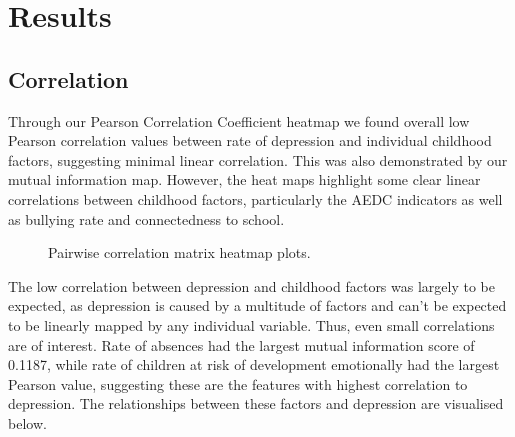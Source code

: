 \documentclass[a4, 11pt]{article}
\begin{document}
\newpage
\section{Results}
\subsection{Correlation}
Through our Pearson Correlation Coefficient heatmap we found overall low Pearson correlation values between rate of depression and individual childhood factors, suggesting minimal linear correlation. This was also demonstrated by our mutual information map. However, the heat maps highlight some clear linear correlations between childhood factors, particularly the AEDC indicators as well as bullying rate and connectedness to school.

\begin{figure}[h]
    \captionsetup[subfigure]{labelformat=empty}
    \centering
    \caption{Pairwise correlation matrix heatmap plots.}
\end{figure}
The low correlation between depression and childhood factors was largely to be expected, as depression is caused by a multitude of factors and can’t be expected to be linearly mapped by any individual variable. Thus, even small correlations are of interest. Rate of absences had the largest mutual information score of 0.1187, while rate of children at risk of development emotionally had the largest Pearson value, suggesting these are the features with highest correlation to depression. The relationships between these factors and depression are visualised below.
\end{document}

